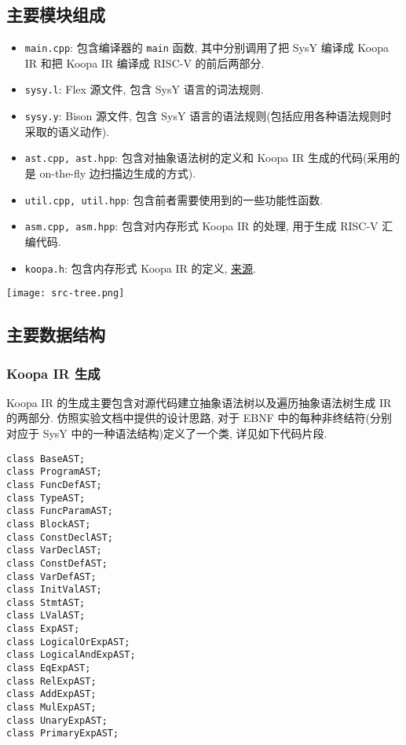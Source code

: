 \documentclass[8pt]{article}
\theoremstyle{compact}
\begin{document}
\subsection{主要模块组成}
\begin{itemize}
    \item \texttt{main.cpp}: 包含编译器的 \texttt{main} 函数, 其中分别调用了把 SysY 编译成 Koopa IR 和把 Koopa IR 编译成 RISC-V 的前后两部分.
    \item \texttt{sysy.l}: Flex 源文件, 包含 SysY 语言的词法规则.
    \item \texttt{sysy.y}: Bison 源文件, 包含 SysY 语言的语法规则(包括应用各种语法规则时采取的语义动作).
    \item \texttt{ast.cpp, ast.hpp}: 包含对抽象语法树的定义和 Koopa IR 生成的代码(采用的是 on-the-fly 边扫描边生成的方式).
    \item \texttt{util.cpp, util.hpp}: 包含前者需要使用到的一些功能性函数.
    \item \texttt{asm.cpp, asm.hpp}: 包含对内存形式 Koopa IR 的处理, 用于生成 RISC-V 汇编代码.
    \item \texttt{koopa.h}: 包含内存形式 Koopa IR 的定义, \href{https://github.com/pku-minic/koopa/blob/master/crates/libkoopa/include/koopa.h}{来源}.
\end{itemize}
\begin{center}
    \texttt{[image: src-tree.png]}
\end{center}
\subsection{主要数据结构}
\subsubsection{Koopa IR 生成}
Koopa IR 的生成主要包含对源代码建立抽象语法树以及遍历抽象语法树生成 IR 的两部分. 仿照实验文档中提供的设计思路, 对于 EBNF 中的每种非终结符(分别对应于 SysY 中的一种语法结构)定义了一个类, 详见如下代码片段.
\begin{verbatim}
class BaseAST;
class ProgramAST;
class FuncDefAST;
class TypeAST;
class FuncParamAST;
class BlockAST;
class ConstDeclAST;
class VarDeclAST;
class ConstDefAST;
class VarDefAST;
class InitValAST;
class StmtAST;
class LValAST;
class ExpAST;
class LogicalOrExpAST;
class LogicalAndExpAST;
class EqExpAST;
class RelExpAST;
class AddExpAST;
class MulExpAST;
class UnaryExpAST;
class PrimaryExpAST;    
\end{verbatim}
\end{document}
